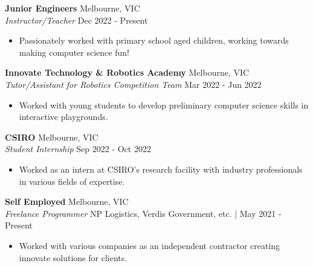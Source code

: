 \documentclass[a4paper]{article}
\begin{document}
\textbf{Junior Engineers} \hfill Melbourne, VIC\\
\textit{Instructor/Teacher} \hfill Dec 2022 - Present\\
\vspace{-3mm}
\begin{itemize} \itemsep 0.5pt
    \item Passionately worked with primary school aged children, working towards making computer science fun!
\end{itemize}
\vspace{-2mm}

\textbf{Innovate Technology \& Robotics Academy} \hfill Melbourne, VIC\\
\textit{Tutor/Assistant for Robotics Competition Team} \hfill Mar 2022 - Jun 2022\\
\vspace{-3mm}
\begin{itemize} \itemsep 0.5pt
	\item Worked with young students to develop preliminary computer science skills in interactive playgrounds.
\end{itemize}
\vspace{-2mm}

\textbf{CSIRO} \hfill Melbourne, VIC\\
\textit{Student Internship} \hfill Sep 2022 - Oct 2022\\
\vspace{-3mm}
\begin{itemize} \itemsep 0.5pt
\item Worked as an intern at CSIRO's research facility with industry professionals in various fields of expertise.
\end{itemize}
\vspace{-2mm}

\textbf{Self Employed} \hfill Melbourne, VIC\\
\textit{Freelance Programmer} \hfill NP Logistics, Verdis Government, etc. | May 2021 - Present\\
\vspace{-3mm}
\begin{itemize} \itemsep 0.5pt
	\item Worked with various companies as an independent contractor creating innovate solutions for clients.
\end{itemize}
\vspace{-2mm}
\end{document}
